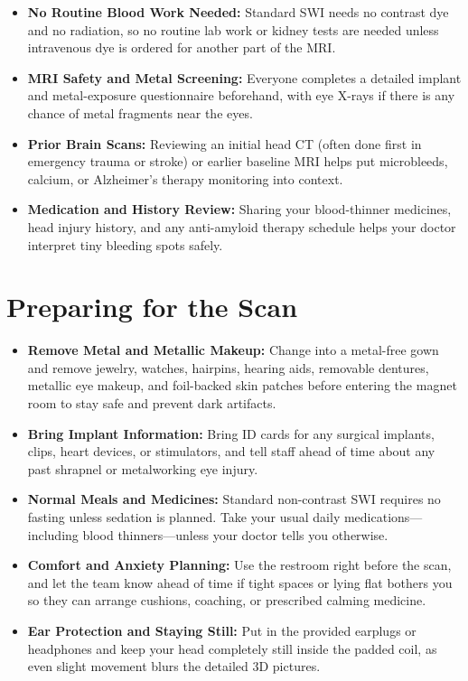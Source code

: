 \begin{itemize}
    \item \textbf{No Routine Blood Work Needed:} Standard SWI needs no contrast dye and no radiation, so no routine lab work or kidney tests are needed unless intravenous dye is ordered for another part of the MRI.
    \item \textbf{MRI Safety and Metal Screening:} Everyone completes a detailed implant and metal-exposure questionnaire beforehand, with eye X-rays if there is any chance of metal fragments near the eyes.
    \item \textbf{Prior Brain Scans:} Reviewing an initial head CT (often done first in emergency trauma or stroke) or earlier baseline MRI helps put microbleeds, calcium, or Alzheimer's therapy monitoring into context.
    \item \textbf{Medication and History Review:} Sharing your blood-thinner medicines, head injury history, and any anti-amyloid therapy schedule helps your doctor interpret tiny bleeding spots safely.
\end{itemize}

\section{Preparing for the Scan}

\begin{itemize}
    \item \textbf{Remove Metal and Metallic Makeup:} Change into a metal-free gown and remove jewelry, watches, hairpins, hearing aids, removable dentures, metallic eye makeup, and foil-backed skin patches before entering the magnet room to stay safe and prevent dark artifacts.
    \item \textbf{Bring Implant Information:} Bring ID cards for any surgical implants, clips, heart devices, or stimulators, and tell staff ahead of time about any past shrapnel or metalworking eye injury.
    \item \textbf{Normal Meals and Medicines:} Standard non-contrast SWI requires no fasting unless sedation is planned. Take your usual daily medications---including blood thinners---unless your doctor tells you otherwise.
    \item \textbf{Comfort and Anxiety Planning:} Use the restroom right before the scan, and let the team know ahead of time if tight spaces or lying flat bothers you so they can arrange cushions, coaching, or prescribed calming medicine.
    \item \textbf{Ear Protection and Staying Still:} Put in the provided earplugs or headphones and keep your head completely still inside the padded coil, as even slight movement blurs the detailed 3D pictures.
\end{itemize}

